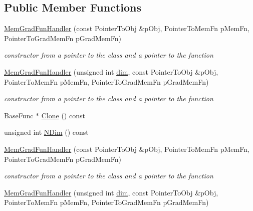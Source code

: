 \subsection*{Public Member Functions}
\begin{DoxyCompactItemize}
\item 
\mbox{\hyperlink{classROOT_1_1Math_1_1MemGradFunHandler_afb840379796fb7d05d885bc3152a3175}{Mem\+Grad\+Fun\+Handler}} (const Pointer\+To\+Obj \&p\+Obj, Pointer\+To\+Mem\+Fn p\+Mem\+Fn, Pointer\+To\+Grad\+Mem\+Fn p\+Grad\+Mem\+Fn)
\begin{DoxyCompactList}\small\item\em constructor from a pointer to the class and a pointer to the function \end{DoxyCompactList}\item 
\mbox{\hyperlink{classROOT_1_1Math_1_1MemGradFunHandler_a1e421d0a42589a826fd0b9f7f1a475ec}{Mem\+Grad\+Fun\+Handler}} (unsigned int \mbox{\hyperlink{adat__devel_2lib_2hadron_2irrep__util_8cc_a70b5e28b5bc3d1b63a7435c5fe50b837}{dim}}, const Pointer\+To\+Obj \&p\+Obj, Pointer\+To\+Mem\+Fn p\+Mem\+Fn, Pointer\+To\+Grad\+Mem\+Fn p\+Grad\+Mem\+Fn)
\begin{DoxyCompactList}\small\item\em constructor from a pointer to the class and a pointer to the function \end{DoxyCompactList}\item 
Base\+Func $\ast$ \mbox{\hyperlink{classROOT_1_1Math_1_1MemGradFunHandler_a987e3b1a8492990c3c2a5c3eca9964a6}{Clone}} () const
\item 
unsigned int \mbox{\hyperlink{classROOT_1_1Math_1_1MemGradFunHandler_acdd729dc718e1ecf3bac32af990904b4}{N\+Dim}} () const
\item 
\mbox{\hyperlink{classROOT_1_1Math_1_1MemGradFunHandler_afb840379796fb7d05d885bc3152a3175}{Mem\+Grad\+Fun\+Handler}} (const Pointer\+To\+Obj \&p\+Obj, Pointer\+To\+Mem\+Fn p\+Mem\+Fn, Pointer\+To\+Grad\+Mem\+Fn p\+Grad\+Mem\+Fn)
\begin{DoxyCompactList}\small\item\em constructor from a pointer to the class and a pointer to the function \end{DoxyCompactList}\item 
\mbox{\hyperlink{classROOT_1_1Math_1_1MemGradFunHandler_a1e421d0a42589a826fd0b9f7f1a475ec}{Mem\+Grad\+Fun\+Handler}} (unsigned int \mbox{\hyperlink{adat__devel_2lib_2hadron_2irrep__util_8cc_a70b5e28b5bc3d1b63a7435c5fe50b837}{dim}}, const Pointer\+To\+Obj \&p\+Obj, Pointer\+To\+Mem\+Fn p\+Mem\+Fn, Pointer\+To\+Grad\+Mem\+Fn p\+Grad\+Mem\+Fn)

\end{DoxyCompactItemize}
